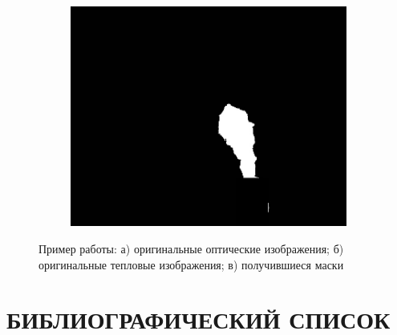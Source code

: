 \documentclass[14pt, a4paper]{extreport}
\begin{document}
\begin{figure}[h!]
\begin{subfigure}{.32\textwidth}
			\includegraphics[width = \textwidth]{image/chapter_3/examples/mask/240}
			\caption{}
		\end{subfigure}
		\caption{Пример работы: а) оригинальные оптические изображения; б) оригинальные тепловые изображения; в) получившиеся маски}
		\label{fig:test_segm}
	\end{figure}
	
	\chapter*{БИБЛИОГРАФИЧЕСКИЙ СПИСОК}
	
\end{document}
